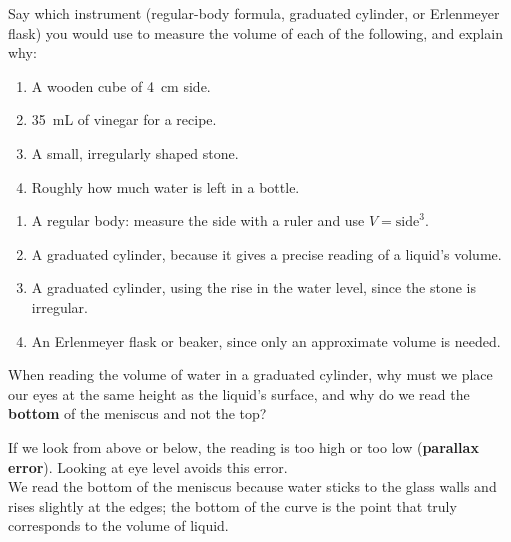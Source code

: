 \begin{exercise}
    Say which instrument (regular-body formula, graduated cylinder, or Erlenmeyer flask) you would use to measure the volume of each of the following, and explain why:
    \begin{enumerate}[label=\letraminuscula]
        \item A wooden cube of \qty{4}{\cm} side.
        \item \qty{35}{\mL} of vinegar for a recipe.
        \item A small, irregularly shaped stone.
        \item Roughly how much water is left in a bottle.
    \end{enumerate}
    \begin{solu}
        \begin{enumerate}[label=\alph*)]
            \item A regular body: measure the side with a ruler and use \(V = \text{side}^3\).
            \item A graduated cylinder, because it gives a precise reading of a liquid's volume.
            \item A graduated cylinder, using the rise in the water level, since the stone is irregular.
            \item An Erlenmeyer flask or beaker, since only an approximate volume is needed.
        \end{enumerate}
    \end{solu}
\end{exercise}

\begin{exercise}
    When reading the volume of water in a graduated cylinder, why must we place our eyes at the same height as the liquid's surface, and why do we read the \textbf{bottom} of the meniscus and not the top?
    \begin{solu}
        If we look from above or below, the reading is too high or too low (\textbf{parallax error}). Looking at eye level avoids this error. \\
        We read the bottom of the meniscus because water sticks to the glass walls and rises slightly at the edges; the bottom of the curve is the point that truly corresponds to the volume of liquid.
    \end{solu}
\end{exercise}

